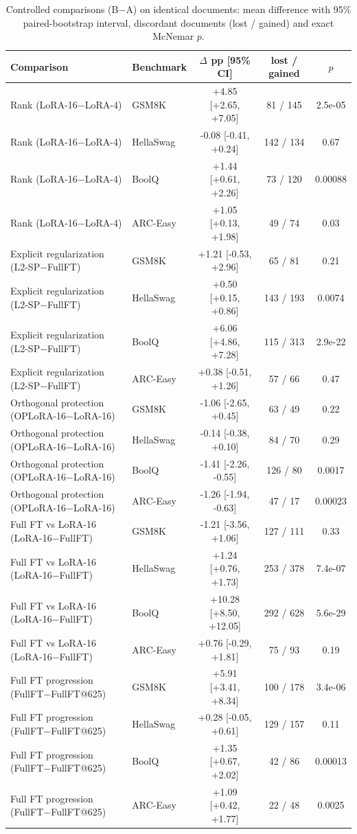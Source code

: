 \begin{table}[t]
\centering
\small
\caption{Controlled comparisons (B$-$A) on identical documents: mean difference with 95\% paired-bootstrap interval, discordant documents (lost / gained) and exact McNemar $p$.}
\label{tab:t1_pairs}
\begin{tabular}{llccc}
\toprule
Comparison & Benchmark & $\Delta$ pp [95\% CI] & lost / gained & $p$ \\
\midrule
Rank (LoRA-16$-$LoRA-4) & GSM8K & +4.85 [+2.65, +7.05] & 81 / 145 & 2.5e-05 \\
Rank (LoRA-16$-$LoRA-4) & HellaSwag & -0.08 [-0.41, +0.24] & 142 / 134 & 0.67 \\
Rank (LoRA-16$-$LoRA-4) & BoolQ & +1.44 [+0.61, +2.26] & 73 / 120 & 0.00088 \\
Rank (LoRA-16$-$LoRA-4) & ARC-Easy & +1.05 [+0.13, +1.98] & 49 / 74 & 0.03 \\
Explicit regularization (L2-SP$-$FullFT) & GSM8K & +1.21 [-0.53, +2.96] & 65 / 81 & 0.21 \\
Explicit regularization (L2-SP$-$FullFT) & HellaSwag & +0.50 [+0.15, +0.86] & 143 / 193 & 0.0074 \\
Explicit regularization (L2-SP$-$FullFT) & BoolQ & +6.06 [+4.86, +7.28] & 115 / 313 & 2.9e-22 \\
Explicit regularization (L2-SP$-$FullFT) & ARC-Easy & +0.38 [-0.51, +1.26] & 57 / 66 & 0.47 \\
Orthogonal protection (OPLoRA-16$-$LoRA-16) & GSM8K & -1.06 [-2.65, +0.45] & 63 / 49 & 0.22 \\
Orthogonal protection (OPLoRA-16$-$LoRA-16) & HellaSwag & -0.14 [-0.38, +0.10] & 84 / 70 & 0.29 \\
Orthogonal protection (OPLoRA-16$-$LoRA-16) & BoolQ & -1.41 [-2.26, -0.55] & 126 / 80 & 0.0017 \\
Orthogonal protection (OPLoRA-16$-$LoRA-16) & ARC-Easy & -1.26 [-1.94, -0.63] & 47 / 17 & 0.00023 \\
Full FT vs LoRA-16 (LoRA-16$-$FullFT) & GSM8K & -1.21 [-3.56, +1.06] & 127 / 111 & 0.33 \\
Full FT vs LoRA-16 (LoRA-16$-$FullFT) & HellaSwag & +1.24 [+0.76, +1.73] & 253 / 378 & 7.4e-07 \\
Full FT vs LoRA-16 (LoRA-16$-$FullFT) & BoolQ & +10.28 [+8.50, +12.05] & 292 / 628 & 5.6e-29 \\
Full FT vs LoRA-16 (LoRA-16$-$FullFT) & ARC-Easy & +0.76 [-0.29, +1.81] & 75 / 93 & 0.19 \\
Full FT progression (FullFT$-$FullFT@625) & GSM8K & +5.91 [+3.41, +8.34] & 100 / 178 & 3.4e-06 \\
Full FT progression (FullFT$-$FullFT@625) & HellaSwag & +0.28 [-0.05, +0.61] & 129 / 157 & 0.11 \\
Full FT progression (FullFT$-$FullFT@625) & BoolQ & +1.35 [+0.67, +2.02] & 42 / 86 & 0.00013 \\
Full FT progression (FullFT$-$FullFT@625) & ARC-Easy & +1.09 [+0.42, +1.77] & 22 / 48 & 0.0025 \\
\bottomrule
\end{tabular}
\end{table}
